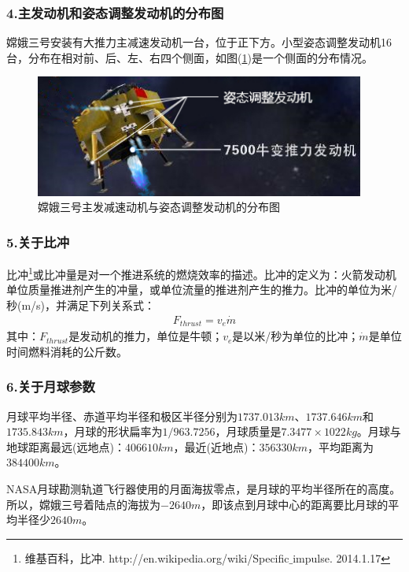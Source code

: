         \subsubsection{4.主发动机和姿态调整发动机的分布图}
            \par
            嫦娥三号安装有大推力主减速发动机一台，位于正下方。小型姿态调整发动机16台，分布在相对前、后、左、右四个侧面，如图(\ref{fig:嫦娥三号主发减速动机与姿态调整发动机的分布图})是一个侧面的分布情况。
            \begin{figure}[H]
            \centering
            \includegraphics[height=4cm]{images/Main_engine_deceleration_motive.jpg}
            \caption{嫦娥三号主发减速动机与姿态调整发动机的分布图}
            \label{fig:嫦娥三号主发减速动机与姿态调整发动机的分布图}
            \end{figure}
        \subsubsection{5.关于比冲}
            \par
            比冲\footnote{维基百科，比冲. http://en.wikipedia.org/wiki/Specific$\_$impulse. 2014.1.17}或比冲量是对一个推进系统的燃烧效率的描述。比冲的定义为：火箭发动机单位质量推进剂产生的冲量，或单位流量的推进剂产生的推力。比冲的单位为米/秒(m/s)，并满足下列关系式：
            \begin{align*}
            F_{thrust} = v_e\dot{m}
            \end{align*}
            其中：$F_{thrust}$是发动机的推力，单位是牛顿；$v_e$是以米/秒为单位的比冲；$\dot{m}$是单位时间燃料消耗的公斤数。
        \subsubsection{6.关于月球参数}
            \par
            月球平均半径、赤道平均半径和极区半径分别为$1737.013km$、$1737.646km$和$1735.843km$，月球的形状扁率为$1/963.7256$，月球质量是$7.3477\times 1022kg$。月球与地球距离最远(远地点)：$406610km$，最近(近地点)：$356330km$，平均距离为$384400km$。
            \par
            NASA月球勘测轨道飞行器使用的月面海拔零点，是月球的平均半径所在的高度。所以，嫦娥三号着陆点的海拔为$-2640m$，即该点到月球中心的距离要比月球的平均半径少$2640m$。
